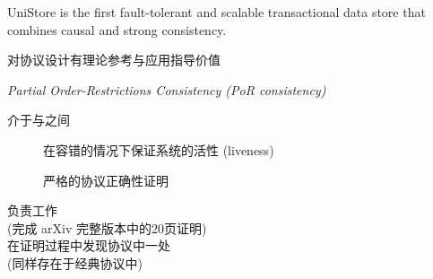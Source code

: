 
\begin{frame}{}
  \begin{center}
    \vspace{0.20cm}

    \vspace{1.00cm}
    UniStore is the first fault-tolerant and scalable transactional data store
    that combines causal and strong consistency.

    \vspace{0.30cm}
    对协议设计有理论参考与应用指导价值
  \end{center}
\end{frame}

\begin{frame}{}
  \begin{center}
    {\it Partial Order-Restrictions Consistency (PoR consistency)}

    \vspace{0.30cm}
    介于与之间

    \vspace{1.20cm}
    \begin{description}
      \item[] 在容错的情况下保证系统的活性 (liveness) \\[10pt]
      \item[] 严格的协议正确性证明
    \end{description}
  \end{center}
\end{frame}

\begin{frame}{} %
  \begin{center}
    \vspace{0.20cm}

    \vspace{1.20cm}
    负责工作 \\[3pt]
    (完成 \textsf{arXiv} 完整版本中的20页证明) \\[12pt]

    在证明过程中发现协议中一处 \\[3pt]
    (同样存在于经典协议中)
  \end{center}
\end{frame}

